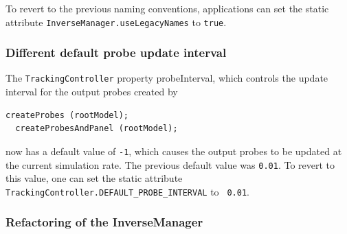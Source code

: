 \documentclass{article}
\begin{document}
\begin{sideblock}
To revert to the previous naming conventions, applications can set the
static attribute {\tt InverseManager.useLegacyNames} to {\tt true}.
\end{sideblock}

\subsubsection*{Different default probe update interval}

The {\tt TrackingController} property {\sf probeInterval}, which
controls the update interval for the output probes created by
%
\begin{lstlisting}[]
  createProbes (rootModel);
  createProbesAndPanel (rootModel);
\end{lstlisting}
%
now has a default value of {\tt -1}, which causes the output probes to
be updated at the current simulation rate. The previous default value
was {\tt 0.01}. To revert to this value, one can set the static
attribute {\tt TrackingController.DEFAULT\_PROBE\_INTERVAL} to {\tt
0.01}.

\subsubsection*{Refactoring of the InverseManager}
\end{document}
